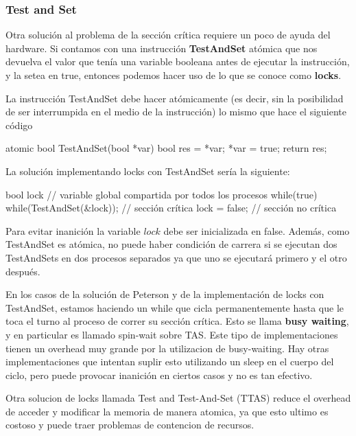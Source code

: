 \documentclass{article}
\begin{document}
\subsubsection{Test and Set}

Otra soluci\'on al problema de la secci\'on cr\'itica requiere un poco de ayuda del hardware. Si contamos con una instrucci\'on \textbf{TestAndSet} at\'omica que nos devuelva el valor que ten\'ia una variable booleana antes de ejecutar la instrucci\'on, y la setea en true, entonces podemos hacer uso de lo que se conoce como \textbf{locks}.

La instrucci\'on TestAndSet debe hacer at\'omicamente (es decir, sin la posibilidad de ser interrumpida en el medio de la instrucci\'on) lo mismo que hace el siguiente c\'odigo

\begin{code}
atomic bool TestAndSet(bool *var)
{
    bool res = *var;
		*var = true;
		return res;
}
\end{code}

La soluci\'on implementando locks con TestAndSet ser\'ia la siguiente:

\begin{code}
bool lock // variable global compartida por todos los procesos
while(true)
{
    while(TestAndSet(&lock));
		// sección crítica
		lock = false;
		// sección no crítica
}
\end{code}

Para evitar inanici\'on la variable $lock$ debe ser inicializada en false. Adem\'as, como TestAndSet es at\'omica, no puede haber condici\'on de carrera si se ejecutan dos TestAndSets en dos procesos separados ya que uno se ejecutar\'a primero y el otro despu\'es.

En los casos de la soluci\'on de Peterson y de la implementaci\'on de locks con TestAndSet, estamos haciendo un while que cicla permanentemente hasta que le toca el turno al proceso de correr su secci\'on cr\'itica. Esto se llama \textbf{busy waiting}, y en particular es llamado spin-wait sobre TAS. Este tipo de implementaciones tienen un overhead muy grande por la utilizacion de busy-waiting. Hay otras implementaciones que intentan suplir esto utilizando un sleep en el cuerpo del ciclo, pero puede provocar inanición en ciertos casos y no es tan efectivo.

Otra solucion de locks llamada Test and Test-And-Set (TTAS) reduce el overhead de acceder y modificar la memoria de manera atomica, ya que esto ultimo es costoso y puede traer problemas de contencion de recursos.
\end{document}
